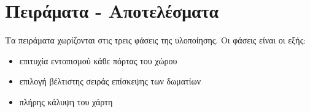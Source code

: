 \chapter{Πειράματα - Αποτελέσματα}
\label{chapter:experiments}

Τα πειράματα χωρίζονται στις τρεις φάσεις της υλοποίησης. Οι φάσεις είναι οι εξής:

\begin{itemize}
    \setlength\itemsep{-0.2em}
    \item επιτυχία εντοπισμού κάθε πόρτας του χώρου
    \item επιλογή βέλτιστης σειράς επίσκεψης των δωματίων
    \item πλήρης κάλυψη του χάρτη
\end{itemize}






